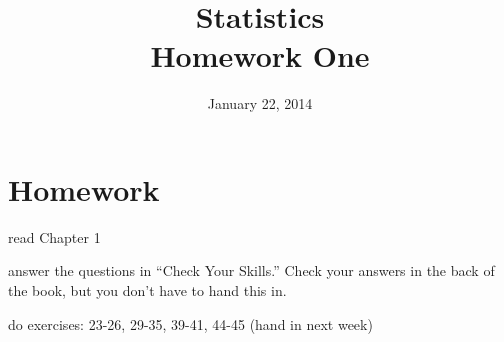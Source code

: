 \documentclass{exam}
\title{Statistics \\ Homework One}
\author{}
\date{January 22, 2014}
\begin{document}
  \maketitle

  \section{Homework}
    \begin{itemize*}
      \item read Chapter 1 
      \item answer the questions in ``Check Your Skills.''  Check your answers
        in the back of the book, but you don't have to hand this in.
      \item do exercises: 23-26, 29-35, 39-41, 44-45 (hand in next week)
    \end{itemize*}

  \ifprintanswers
\end{document}
